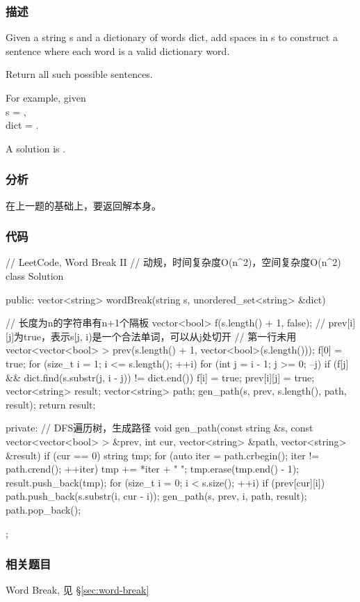 \subsubsection{描述}
Given a string s and a dictionary of words dict, add spaces in s to construct a sentence where each word is a valid dictionary word.

Return all such possible sentences.

For example, given  \\
s = , \\
dict = .

A solution is .


\subsubsection{分析}
在上一题的基础上，要返回解本身。


\subsubsection{代码}
\begin{Code}
// LeetCode, Word Break II
// 动规，时间复杂度O(n^2)，空间复杂度O(n^2)
class Solution {
public:
    vector<string> wordBreak(string s, unordered_set<string> &dict) {
        // 长度为n的字符串有n+1个隔板
        vector<bool> f(s.length() + 1, false);
        // prev[i][j]为true，表示s[j, i)是一个合法单词，可以从j处切开
        // 第一行未用
        vector<vector<bool> > prev(s.length() + 1, vector<bool>(s.length()));
        f[0] = true;
        for (size_t i = 1; i <= s.length(); ++i) {
            for (int j = i - 1; j >= 0; --j) {
                if (f[j] && dict.find(s.substr(j, i - j)) != dict.end()) {
                    f[i] = true;
                    prev[i][j] = true;
                }
            }
        }
        vector<string> result;
        vector<string> path;
        gen_path(s, prev, s.length(), path, result);
        return result;

    }
private:
    // DFS遍历树，生成路径
    void gen_path(const string &s, const vector<vector<bool> > &prev,
            int cur, vector<string> &path, vector<string> &result) {
        if (cur == 0) {
            string tmp;
            for (auto iter = path.crbegin(); iter != path.crend(); ++iter)
                tmp += *iter + " ";
            tmp.erase(tmp.end() - 1);
            result.push_back(tmp);
        }
        for (size_t i = 0; i < s.size(); ++i) {
            if (prev[cur][i]) {
                path.push_back(s.substr(i, cur - i));
                gen_path(s, prev, i, path, result);
                path.pop_back();
            }
        }
    }
};
\end{Code}


\subsubsection{相关题目}
\begindot
\item Word Break, 见 \S \ref{sec:word-break}
\myenddot
